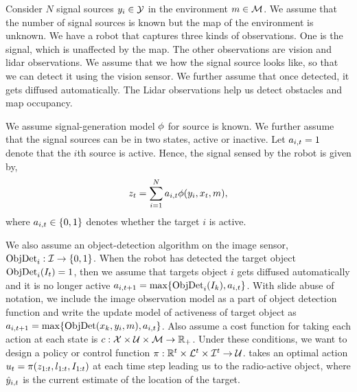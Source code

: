 Consider $N$ signal sources $y_i \in \mathcal{Y}$ in the environment $m \in
\mathcal{M}$.
We assume that the number of signal sources is known but the map of the
environment is unknown.
We have a robot that captures three kinds of observations. One is
 the signal, which is unaffected by the map.
 The other observations are vision and lidar observations.
We assume that we how the signal source looks like, so that we can
detect it using the vision sensor. We further assume that once detected, it gets
diffused automatically.
The Lidar observations help us detect obstacles and map occupancy.

We assume signal-generation model $\phi$ for source is known.
We further assume that the signal sources can be in two states, active or inactive.
Let $a_{i,t} = 1$ denote that the $i$th source is active.
Hence, the signal sensed by the robot is given by,
%
\begin{align}
z_t = \sum_{i=1}^Na_{i,t} \phi(y_i, x_t, m),
\end{align}%
% 
where $a_{i,t} \in \{0, 1\}$ denotes whether the target $i$ is
active.

We also assume an object-detection algorithm on the image sensor,
$\text{ObjDet}_i: \mathcal{I} \to \{0, 1\}$.
When the robot has detected the target object $\text{ObjDet}_i(I_t) =
1$, then we assume that targets object $i$ gets diffused automatically
and it is no longer active $a_{i,t+1} = \max\{ \text{ObjDet}_i(I_k), a_{i,t}\}$.
With slide abuse of notation, we include the image observation model as a part
of object detection function and write the update model of activeness of target
object as $a_{i,t+1} = \max\{ \text{ObjDet}(x_k, y_i, m), a_{i,t}\}$.
Also assume a cost function for taking each action at each state is $c:
\mathcal{X} \times \mathcal{U} \times \mathcal{M} \to \mathbb{R}_+$.
Under these conditions, we want to design a policy or control function $\pi:
\mathbb{R}^t \times \mathcal{L}^t \times \mathcal{I}^t  \to \mathcal{U}$.
takes an optimal action $u_t = \pi(z_{1:t}, l_{1:t}, I_{1:t})$ at
each time step leading us to the radio-active object, where $\hat{y}_{i,t}$ is the
current estimate of the location of the target.

